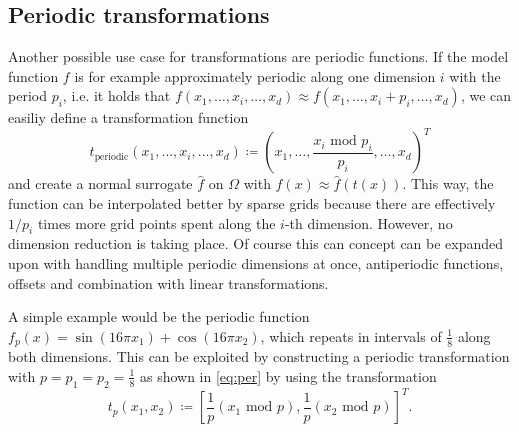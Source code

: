 \documentclass[
  a4paper,  %
  twoside,  %
  bibliography=totoc,
  headsepline,
  cleardoublepage=empty,
  parskip=half,
  draft=false
]{scrbook}
\begin{document}
\subsection{Periodic transformations}

Another possible use case for transformations are periodic functions.
If the model function $f$ is for example approximately periodic along one dimension $i$ with the period $p_i$, i.e. it holds that $f(x_1,\dots,x_i,\dots,x_d) \approx f(x_1,\dots,x_i + p_i, \dots,x_d)$, we can easiliy define a transformation function
\begin{equation}
t_{\text{periodic}}(x_1,\dots,x_i,\dots,x_d) \coloneqq (x_1,\dots, \frac{x_i\text{ mod } p_i}{p_i}, \dots,x_d)^T
\label{eq:per}
\end{equation}
and create a normal surrogate $\hat{f}$ on $\Omega$ with $f(x) \approx \hat{f}(t(x))$.
This way, the function can be interpolated better by sparse grids because there are effectively $1 / p_i$ times more grid points spent along the $i$-th dimension.
However, no dimension reduction is taking place.
Of course this can concept can be expanded upon with handling multiple periodic dimensions at once, antiperiodic functions, offsets and combination with linear transformations.

A simple example would be the periodic function $f_p(x)=\sin(16\pi x_1)  + \cos(16\pi x_2)$, which repeats in intervals of $\frac{1}{8}$ along both dimensions.
This can be exploited by constructing a periodic transformation with $p=p_1=p_2=\frac{1}{8}$ as shown in \cref{eq:per} by using the transformation
\begin{equation}
t_p(x_1,x_2) \coloneqq \left[\frac{1}{p} \left(x_1 \text{ mod } p\right), \frac{1}{p} \left(x_2 \text{ mod } p\right)\right]^T.
\nonumber
\end{equation}
\end{document}
